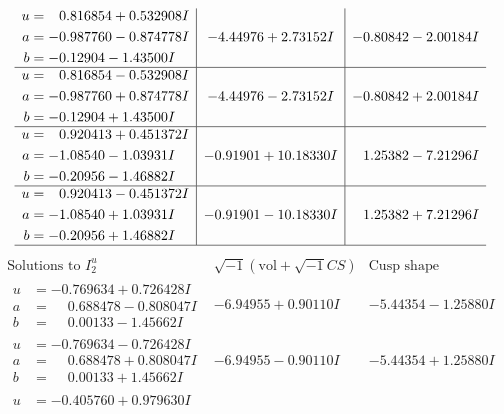 \documentclass[1p]{elsarticle_modified}
\theoremstyle{definition}
\newcommand{\I}{\sqrt{-1}}
\begin{document}
$$\begin{array}{c|c|c}
\begin{aligned}
u &= \phantom{-}0.816854 + 0.532908 I \\
a &= -0.987760 - 0.874778 I \\
b &= -0.12904 - 1.43500 I\end{aligned}
 & -4.44976 + 2.73152 I & -0.80842 - 2.00184 I \\ \hline\begin{aligned}
u &= \phantom{-}0.816854 - 0.532908 I \\
a &= -0.987760 + 0.874778 I \\
b &= -0.12904 + 1.43500 I\end{aligned}
 & -4.44976 - 2.73152 I & -0.80842 + 2.00184 I \\ \hline\begin{aligned}
u &= \phantom{-}0.920413 + 0.451372 I \\
a &= -1.08540 - 1.03931 I \\
b &= -0.20956 - 1.46882 I\end{aligned}
 & -0.91901 + 10.18330 I & \phantom{-}1.25382 - 7.21296 I \\ \hline\begin{aligned}
u &= \phantom{-}0.920413 - 0.451372 I \\
a &= -1.08540 + 1.03931 I \\
b &= -0.20956 + 1.46882 I\end{aligned}
 & -0.91901 - 10.18330 I & \phantom{-}1.25382 + 7.21296 I\\
 \hline 
 \end{array}$$\newpage$$\begin{array}{c|c|c}  
\text{Solutions to }I^u_{2}& \I (\text{vol} + \sqrt{-1}CS) & \text{Cusp shape}\\
 \hline 
\begin{aligned}
u &= -0.769634 + 0.726428 I \\
a &= \phantom{-}0.688478 - 0.808047 I \\
b &= \phantom{-}0.00133 - 1.45662 I\end{aligned}
 & -6.94955 + 0.90110 I & -5.44354 - 1.25880 I \\ \hline\begin{aligned}
u &= -0.769634 - 0.726428 I \\
a &= \phantom{-}0.688478 + 0.808047 I \\
b &= \phantom{-}0.00133 + 1.45662 I\end{aligned}
 & -6.94955 - 0.90110 I & -5.44354 + 1.25880 I \\ \hline\begin{aligned}
u &= -0.405760 + 0.979630 I \\

\end{aligned}
\end{array}$$
\end{document}
